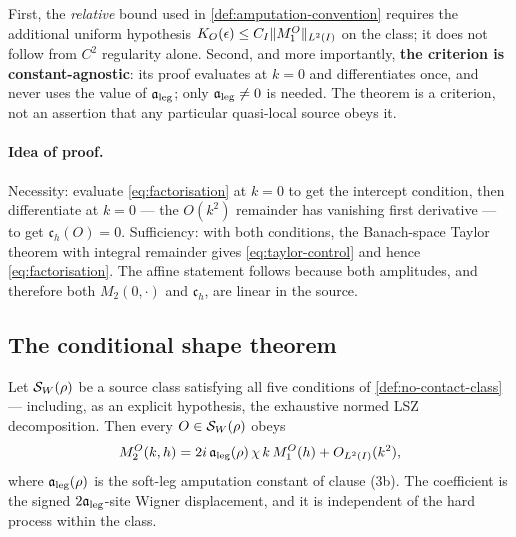 \begin{scope}
\label{scope:ml5-a}
First, the \emph{relative} bound used in \cref{def:amputation-convention}
requires the additional uniform hypothesis
$K_O(\epsilon)\le C_I\lVert M_1^O\rVert_{L^2(I)}$ on the class; it does not follow
from $C^2$ regularity alone. Second, and more importantly, \textbf{the
criterion is constant-agnostic}: its proof evaluates at $k=0$ and
differentiates once, and never uses the value of $\mathfrak{a}_{\mathrm{leg}}$; only $\mathfrak{a}_{\mathrm{leg}}\neq0$ is
needed. The theorem is a criterion, not an assertion that any particular
quasi-local source obeys it.
\end{scope}

\paragraph{Idea of proof.} Necessity: evaluate \cref{eq:factorisation} at
$k=0$ to get the intercept condition, then differentiate at $k=0$ --- the
$O(k^2)$ remainder has vanishing first derivative --- to get
$\mathfrak c_h(O)=0$. Sufficiency: with both conditions, the Banach-space
Taylor theorem with integral remainder gives \cref{eq:taylor-control} and
hence \cref{eq:factorisation}. The affine statement follows because both
amplitudes, and therefore both $M_2(0,\cdot)$ and $\mathfrak c_h$, are linear
in the source.


\subsection{The conditional shape theorem}

\begin{theorem}
\label{thm:ml5-b}
\statusProvedConditional

Let $\mathcal{S}_W(\rho)$ be a source class satisfying all five conditions of
\cref{def:no-contact-class} --- including, as an explicit hypothesis, the
exhaustive normed LSZ decomposition. Then every $O\in\mathcal{S}_W(\rho)$ obeys
\begin{equation}
  M_2^O(k,h)=2i\,\mathfrak{a}_{\mathrm{leg}}(\rho)\,\chi\,k\,M_1^O(h)+O_{L^2(I)}(k^2),
  \label{eq:ml5b-conclusion}
\end{equation}
where $\mathfrak{a}_{\mathrm{leg}}(\rho)$ is the soft-leg amputation constant of clause (3b). The
coefficient is the signed $2\mathfrak{a}_{\mathrm{leg}}$-site Wigner displacement, and it is
independent of the hard process within the class.
\end{theorem}

